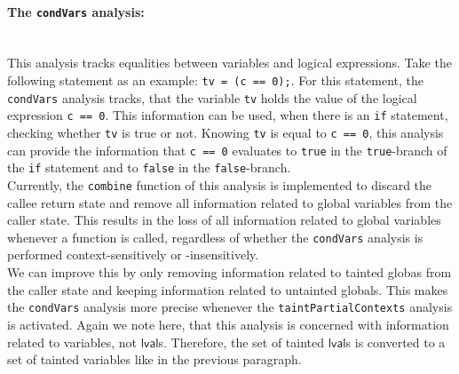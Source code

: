       \paragraph{The \texttt{condVars} analysis:}\mbox{}\\
        This analysis tracks equalities between variables and logical expressions. Take the following statement as an example: \texttt{tv = (c == 0);}. For this statement, the \texttt{condVars} analysis tracks, that the variable \texttt{tv} holds the value of the logical expression \texttt{c == 0}. This information can be used, when there is an \texttt{if} statement, checking whether \texttt{tv} is true or not. Knowing \texttt{tv} is equal to \texttt{c == 0}, this analysis can provide the information that \texttt{c == 0} evaluates to \texttt{true} in the \texttt{true}-branch of the \texttt{if} statement and to \texttt{false} in the \texttt{false}-branch.\\
        Currently, the \texttt{combine} function of this analysis is implemented to discard the callee return state and remove all information related to global variables from the caller state. This results in the loss of all information related to global variables whenever a function is called, regardless of whether the \texttt{condVars} analysis is performed context-sensitively or -insensitively.\\
        We can improve this by only removing information related to tainted globas from the caller state and keeping information related to untainted globals. This makes the \texttt{condVars} analysis more precise whenever the \texttt{taintPartialContexts} analysis is activated. Again we note here, that this analysis is concerned with information related to variables, not $\textsf{lval}$s. Therefore, the set of tainted $\textsf{lval}$s is converted to a set of tainted variables like in the previous paragraph. 
      